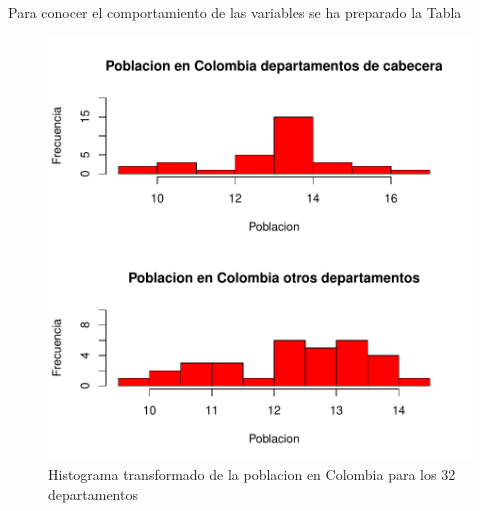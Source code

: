 Para conocer el comportamiento de las variables se ha preparado la Tabla %
\begin{figure}[h]
\centering
\includegraphics{univariada-rehacerhistogramas}
\caption{Histograma transformado de la poblacion en Colombia para los 32 departamentos}
\label{barplot4}
\end{figure}
